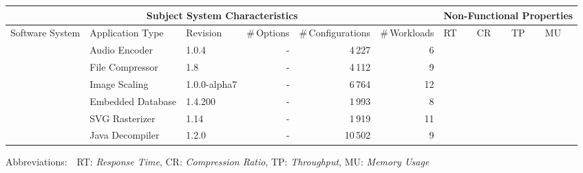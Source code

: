 \begin{tabularx}{\textwidth}{lllrrr|XXXX}
		\toprule
		\multicolumn{6}{c}{\textbf{Subject System Characteristics}} & \multicolumn{4}{c}{\textbf{Non-Functional Properties}} \\
		\midrule
		Software System &  Application Type & Revision & \#\,Options & \#\,Configurations & \#\,Workloads & RT & CR & TP & MU \\
		\midrule
		\jumper & Audio Encoder & 1.0.4 & - & 4\,227 & 6 & \xmark & \xmark &  & \xmark  \\
		
		\kanzi & File Compressor & 1.8 & - & 4\,112 & 9 & \xmark & \xmark &  & \xmark  \\
			
		\dconvert & Image Scaling & 1.0.0-alpha7 & - & 6\,764 & 12 & \xmark  &  &  & \xmark  \\
				
		\htwo & Embedded Database & 1.4.200 & - & 1\,993  & 8 &   &  & \xmark &  \\
		
		\batik & SVG Rasterizer & 1.14 & - & 1\,919 &  11 & \xmark &   &  & \xmark  \\
		
		\jadx & Java Decompiler & 1.2.0 & - & 10\,502 & 9 & \xmark &  &  & \xmark  \\
			
		

		
		
		
		
		\bottomrule
	\end{tabularx}
	
	{\vspace{2mm}
	{\footnotesize Abbreviations:$\quad$RT: \textit{Response Time}, CR: \textit{Compression Ratio}, TP: \textit{Throughput}, MU: \textit{Memory Usage}}}
	\vspace{0.1cm}
